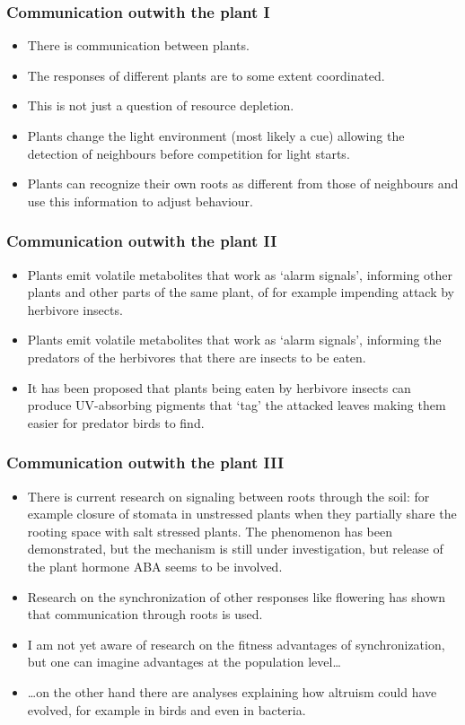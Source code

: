 \documentclass[10pt]{beamer}
\begin{document}
\begin{frame}
\frametitle{Communication outwith the plant I}
  \begin{itemize}
    \item There is communication between plants.
    \item The responses of different plants are to some extent coordinated.
    \item This is not just a question of resource depletion.
    \item Plants change the light environment (most likely a cue) allowing the detection of neighbours before competition for light starts.
    \item Plants can recognize their own roots as different from those of neighbours and use this information to adjust behaviour.
  \end{itemize}
\end{frame}

\begin{frame}
\frametitle{Communication outwith the plant II}
  \begin{itemize}
    \item Plants emit volatile metabolites that work as `alarm signals', informing other plants and other parts of the same plant, of for example impending attack by herbivore insects.
    \item Plants emit volatile metabolites that work as `alarm signals', informing the predators of the herbivores that there are insects to be eaten.
    \item It has been proposed that plants being eaten by herbivore insects can produce UV-absorbing pigments that `tag' the attacked leaves making them easier for predator birds to find.
  \end{itemize}
\end{frame}

\begin{frame}
\frametitle{Communication outwith the plant III}
  \begin{itemize}
    \item There is current research on signaling between roots through the soil: for example closure of stomata in unstressed plants when they partially share the rooting space with salt stressed plants. The phenomenon has been demonstrated, but the mechanism is still under investigation, but release of the plant hormone ABA seems to be involved.
    \item Research on the synchronization of other responses like flowering has shown that communication through roots is used.
    \item I am not yet aware of research on the fitness advantages of synchronization, but one can imagine advantages at the population level\ldots
    \item \ldots on the other hand there are analyses explaining how altruism could have evolved, for example in birds and even in bacteria.
\end{itemize}
\end{frame}
\end{document}
